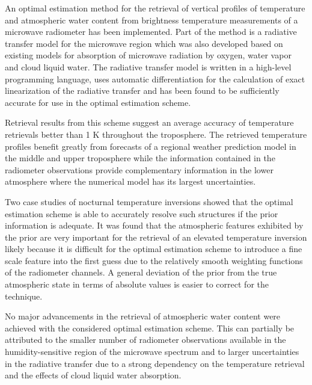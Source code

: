 \startsection[title=Conclusions]

    An optimal estimation method for the retrieval of vertical profiles of
    temperature and atmospheric water content from brightness temperature
    measurements of a microwave radiometer has been implemented. Part of the
    method is a radiative transfer model for the microwave region which was
    also developed based on existing models for absorption of microwave
    radiation by oxygen, water vapor and cloud liquid water. The radiative
    transfer model is written in a high-level programming language, uses
    automatic differentiation for the calculation of exact linearization of the
    radiative transfer and has been found to be sufficiently accurate for use in
    the optimal estimation scheme.

    Retrieval results from this scheme suggest an average accuracy of
    temperature retrievals better than 1 K throughout the troposphere. The
    retrieved temperature profiles benefit greatly from forecasts of a
    regional weather prediction model in the middle and upper troposphere
    while the information contained in the radiometer observations provide
    complementary information in the lower atmosphere where the numerical model
    has its largest uncertainties.
    
    Two case studies of nocturnal temperature inversions showed that the
    optimal estimation scheme is able to accurately resolve such structures
    if the prior information is adequate. It was found that the atmospheric
    features exhibited by the prior are very important for the retrieval
    of an elevated temperature inversion likely because it is difficult for
    the optimal estimation scheme to introduce a fine scale feature into
    the first guess due to the relatively smooth weighting functions of the
    radiometer channels. A general deviation of the prior from the true
    atmospheric state in terms of absolute values is easier to correct
    for the technique.

    No major advancements in the retrieval of atmospheric water content were
    achieved with the considered optimal estimation scheme.
    This can partially be attributed
    to the smaller number of radiometer observations available in the
    humidity-sensitive region of the microwave spectrum and to larger
    uncertainties in the radiative transfer due to a strong dependency on
    the temperature retrieval and the effects of cloud liquid water absorption.

\stopsection


